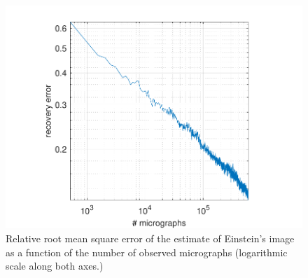 \documentclass[english,11pt]{article}
\newcommand{\1}{\mathbf{1}}
\numberwithin{equation}{section}
\theoremstyle{plain}
\theoremstyle{definition}
\theoremstyle{remark}
\theoremstyle{plain}
\theoremstyle{remark}
\theoremstyle{plain}
\theoremstyle{plain}
\begin{document}
\begin{figure}[h]
\centering
\includegraphics[scale=.7]{Einstein_progress}
\caption{\label{fig:error_per_micro} Relative root mean square error of the estimate of Einstein's image as a function of the number of observed micrographs (logarithmic scale along both axes.)}
\end{figure}



%
\end{document}
